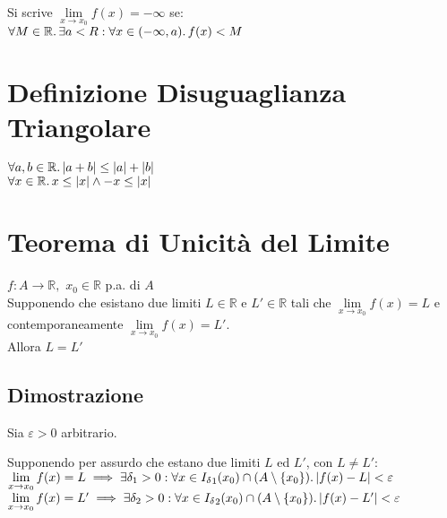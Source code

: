 \documentclass[a4paper, twoside, italian, 11pt]{book}
\newcommand{\braces}[1] {\left \{ #1 \right \}}
\newcommand{\abs}[1] {\left | #1 \right |}
\newcommand{\R}{\mathbb{R}}
\begin{document}
\noindent
Si scrive $\lim\limits_{x \to x_0} f(x) = -\infty$ se: \\

\noindent
$\forall M \in \R \ldotp \exists a < R : \forall x \in (-\infty, a) \ldotp f(x) < M$



\section{Definizione Disuguaglianza Triangolare}

\noindent
$\forall a,b \in \R \ldotp \abs{a + b} \leq \abs{a} + \abs{b}$ \\

\noindent
$\forall x \in \R \ldotp x \leq \abs{x} \land -x \leq \abs{x}$



\section{Teorema di Unicità del Limite}

\noindent
$f : A \rightarrow \R,$ $x_{0} \in \R$ p.a. di $A$ \\

\noindent
Supponendo che esistano due limiti $L \in \R$ e $L' \in \R$ tali che $\lim\limits_{x \to x_0} f(x) = L$ e contemporaneamente $\lim\limits_{x \to x_0} f(x) = L'$. \\

\noindent
Allora $L = L'$



\subsection{Dimostrazione}

\noindent
Sia $\varepsilon > 0$ arbitrario.

\noindent
Supponendo per assurdo che estano due limiti $L$ ed $L'$, con $L \neq L'$: \\

\noindent
$\lim\limits_{x \to x_0} f(x) = L \implies \exists \delta_1 > 0 : \forall x \in {I_\delta}_1(x_0) \cap (A \setminus \braces{x_0}) \ldotp \abs{f(x) - L} < \varepsilon$ \\

\noindent
$\lim\limits_{x \to x_0} f(x) = L' \implies \exists \delta_2 > 0 : \forall x \in {I_\delta}_2(x_0) \cap (A \setminus \braces{x_0}) \ldotp \abs{f(x) - L'} < \varepsilon$ \\\\
\end{document}
